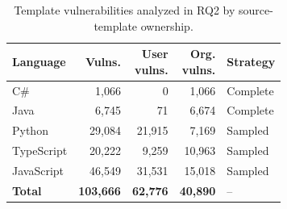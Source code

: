 \begin{table}[t]
\centering
\small
\caption{Template vulnerabilities analyzed in RQ2 by source-template ownership.}
\label{tab:rq2_dataset}
\setlength{\tabcolsep}{4pt}
\begin{tabular}{lrrrl}
\toprule
\textbf{Language} & \textbf{Vulns.} & \shortstack{\textbf{User}\\\textbf{vulns.}} & \shortstack{\textbf{Org.}\\\textbf{vulns.}} & \textbf{Strategy} \\
\midrule
C\# & 1,066 & 0 & 1,066 & Complete \\
Java & 6,745 & 71 & 6,674 & Complete \\
Python & 29,084 & 21,915 & 7,169 & Sampled \\
TypeScript & 20,222 & 9,259 & 10,963 & Sampled \\
JavaScript & 46,549 & 31,531 & 15,018 & Sampled \\
\midrule
\textbf{Total} & \textbf{103,666} & \textbf{62,776} & \textbf{40,890} & -- \\
\bottomrule
\end{tabular}
\end{table}
